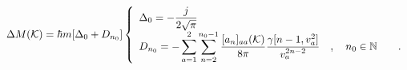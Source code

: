 \begin{equation}
\Delta M ({\cal K}) =\hbar m[\Delta_0 +D_{n_0}] \left\{
\begin{array}{l} \Delta_0=-\displaystyle\frac{j}{2\sqrt{\pi}}  \\
D_{n_0}=-\displaystyle\sum_{a=1}^2\sum_{n=2}^{n_0-1}
\displaystyle\frac{[a_{n}]_{aa}({\cal K})}{8\pi}
\displaystyle\frac{\gamma[n-1,v_a^2]}{v_a^{2n-2}}\quad , \quad
n_0\in{\Bbb N}\qquad .
\end{array}
\right. \label{eq:as}
\end{equation}

